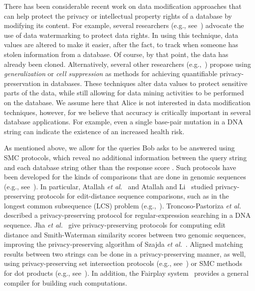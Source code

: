\documentclass{article}
\begin{document}
There has been considerable recent work on data modification
approaches that can help protect the privacy or
intellectual property rights of a database by modifying its content.
For example, several researchers
(e.g., see~\cite{ak-wrd-02,ahk-swrd-03,g-qpwrd-03,sv-hcwsd-04,sap-rprd-03,s-rard-07})
advocate the use of data watermarking to protect data rights.
In using this technique, data values are altered to make it easier,
after the fact, to track when someone has stolen information
from a database.
Of course, by that point, the data has already been cloned.
Alternatively, several
other researchers (e.g.,~\cite{lefevre05,samarati01,samarati98,mw-cok-04,afkmptz-at-05,bkbl-ekuct-07,zyw-pekcd-05,ba-dpoka-05}) propose
using \emph{generalization} or \emph{cell suppression}
as methods for 
achieving quantifiable privacy-preservation in databases.
These techniques alter data values to protect sensitive parts of the data,
while still allowing for data mining activities to be performed on the
database.
We assume here that Alice is not
interested in data modification techniques, however, for we believe that 
accuracy is critically important in several database applications.
For example, even a single
base-pair mutation in a DNA string can indicate the existence of an increased
health risk.

As mentioned above, we allow for the queries Bob asks to be answered
using SMC protocols, which reveal no additional information between the query
string  and each database string  other than the response score .
Such protocols have been developed for
the kinds of comparisons that are done in
genomic sequences (e.g., see~\cite{akd-spsc-03,da-smc-01,FNP04}).
In particular, Atallah {\it et al.}~\cite{akd-spsc-03} and
Atallah and Li~\cite{al-sosc-05}
studied
privacy-preserving protocols for edit-distance sequence comparisons, such as
in the longest common subsequence (LCS) 
problem (e.g.,~\cite{h-lsacm-75, ir-acvlc-08, uah-bclcs-76}).
Troncoso-Pastoriza {\it et al.}~\cite{tkc-pperd-07}
described a privacy-preserving protocol for regular-expression searching 
in a DNA sequence.
Jha {\it et al.}~\cite{jks-tppgc-08} give
privacy-preserving protocols for computing edit distance and
Smith-Waterman similarity scores between two genomic sequences, improving
the privacy-preserving algorithm of Szajda {\it et al.}~\cite{spol-tpdp-06}.
Aligned matching results between two strings can be done in a
privacy-preserving manner, as well, using privacy-preserving set
intersection protocols (e.g., 
see~\cite{ae-nepps-07,FNP04,vc-ssica-05,ss-ppsip-07,ss-ppsib-08})
or SMC methods for
dot products (e.g., see~\cite{dfknt-uscfm-06,gmw-hpamg-87,y-psc-82}).
In addition, the Fairplay system~\cite{bnp-fssmp-08} provides a general
compiler for building such computations.
\end{document}
